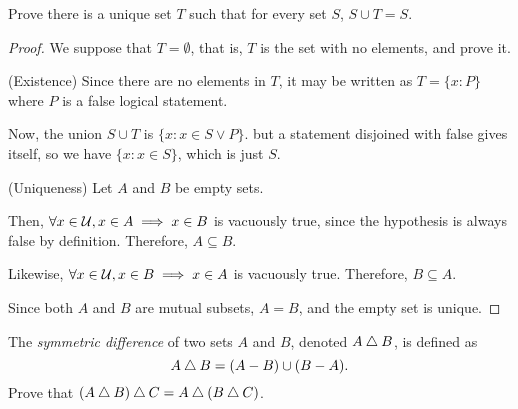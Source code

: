 \question Prove there is a unique set $T$ such that for every set $S$, $S \cup T = S$.

\begin{proof}
  We suppose that $T=\emptyset$, that is, $T$ is the set with no elements, and prove it.

  (Existence) Since there are no elements in $T$, it may be written as $T=\{ x : P \}$
  where $P$ is a false logical statement.

  Now, the union $S \cup T$ is $\{ x : x \in S \lor P \}$.
  but a statement disjoined with false gives itself, so we have $\{ x : x \in S \}$, which is just $S$.

  (Uniqueness) Let $A$ and $B$ be empty sets.

  Then, $\forall x \in \mathcal{U}, x \in A \implies x \in B$ is vacuously true, since the hypothesis is always false by definition.
  Therefore, $A \subseteq B$.

  Likewise, $\forall x \in \mathcal{U}, x \in B \implies x \in A$ is vacuously true.
  Therefore, $B \subseteq A$.

  Since both $A$ and $B$ are mutual subsets, $A=B$, and the empty set is unique.
\end{proof}



\question The \emph{symmetric difference} of two sets $A$ and $B$, denoted $A \mathbin{\triangle} B$, is defined as
\[ A \mathbin{\triangle} B = (A-B) \cup (B-A). \]
Prove that $(A \mathbin{\triangle} B) \mathbin{\triangle} C = A \mathbin{\triangle} (B \mathbin{\triangle} C)$.

